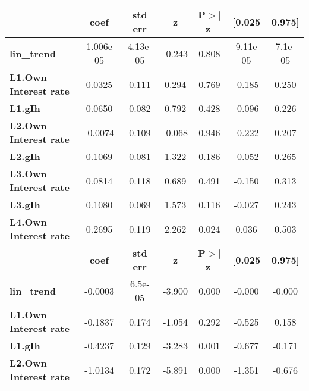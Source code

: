 \begin{center}
\begin{tabular}{lcccccc}
\toprule
                              & \textbf{coef} & \textbf{std err} & \textbf{z} & \textbf{P$> |$z$|$} & \textbf{[0.025} & \textbf{0.975]}  \\
\midrule
\textbf{lin\_trend}           &   -1.006e-05  &     4.13e-05     &    -0.243  &         0.808        &    -9.11e-05    &      7.1e-05     \\
\textbf{L1.Own Interest rate} &       0.0325  &        0.111     &     0.294  &         0.769        &       -0.185    &        0.250     \\
\textbf{L1.gIh}               &       0.0650  &        0.082     &     0.792  &         0.428        &       -0.096    &        0.226     \\
\textbf{L2.Own Interest rate} &      -0.0074  &        0.109     &    -0.068  &         0.946        &       -0.222    &        0.207     \\
\textbf{L2.gIh}               &       0.1069  &        0.081     &     1.322  &         0.186        &       -0.052    &        0.265     \\
\textbf{L3.Own Interest rate} &       0.0814  &        0.118     &     0.689  &         0.491        &       -0.150    &        0.313     \\
\textbf{L3.gIh}               &       0.1080  &        0.069     &     1.573  &         0.116        &       -0.027    &        0.243     \\
\textbf{L4.Own Interest rate} &       0.2695  &        0.119     &     2.262  &         0.024        &        0.036    &        0.503     \\
                              & \textbf{coef} & \textbf{std err} & \textbf{z} & \textbf{P$> |$z$|$} & \textbf{[0.025} & \textbf{0.975]}  \\
\midrule
\textbf{lin\_trend}           &      -0.0003  &      6.5e-05     &    -3.900  &         0.000        &       -0.000    &       -0.000     \\
\textbf{L1.Own Interest rate} &      -0.1837  &        0.174     &    -1.054  &         0.292        &       -0.525    &        0.158     \\
\textbf{L1.gIh}               &      -0.4237  &        0.129     &    -3.283  &         0.001        &       -0.677    &       -0.171     \\
\textbf{L2.Own Interest rate} &      -1.0134  &        0.172     &    -5.891  &         0.000        &       -1.351    &       -0.676     \\

\end{tabular}
\end{center}
